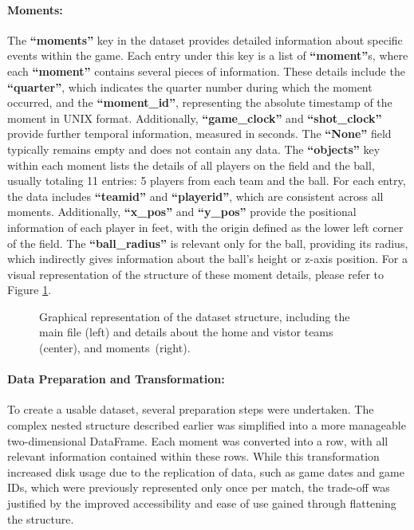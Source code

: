 \paragraph {Moments:}
\label{sect:moments}

The \textbf{``moments''} key in the dataset provides detailed information about specific events within the game. Each entry under this key is a list of \textbf{``moment''}s, where each \textbf{``moment''} contains several pieces of information. These details include the \textbf{``quarter''}, which indicates the quarter number during which the moment occurred, and the \textbf{``moment\_id''}, representing the absolute timestamp of the moment in UNIX format. Additionally, \textbf{``game\_clock''} and \textbf{``shot\_clock''} provide further temporal information, measured in seconds. The \textbf{``None''} field typically remains empty and does not contain any data. The \textbf{``objects''} key within each moment lists the details of all players on the field and the ball, usually totaling 11 entries: 5 players from each team and the ball. For each entry, the data includes \textbf{``teamid''} and \textbf{``playerid''}, which are consistent across all moments. Additionally, \textbf{``x\_pos''} and \textbf{``y\_pos''} provide the positional information of each player in feet, with the origin defined as the lower left corner of the field. The \textbf{``ball\_radius''} is relevant only for the ball, providing its radius, which indirectly gives information about the ball's height or z-axis position. For a visual representation of the structure of these moment details, please refer to Figure \ref{fig:data-structure}.

\begin{figure}[t]
\centering

\caption{Graphical representation of the dataset structure, including the main file (left) and details about the home and vistor teams (center), and moments~(right).}
\label{fig:data-structure}
\end{figure}


\paragraph {Data Preparation and Transformation:}
\label{sect:data-prep}

To create a usable dataset, several preparation steps were undertaken. The complex nested structure described earlier was simplified into a more manageable two-dimensional DataFrame. Each moment was converted into a row, with all relevant information contained within these rows. While this transformation increased disk usage due to the replication of data, such as game dates and game IDs, which were previously represented only once per match, the trade-off was justified by the improved accessibility and ease of use gained through flattening the structure.


